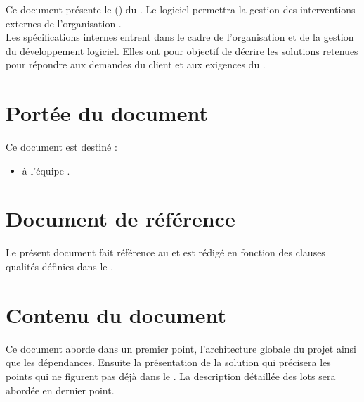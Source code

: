 Ce document présente le \DSI{} (\DSICourt) du \PIC{} \nomPIC. Le logiciel permettra la gestion des interventions externes de l'organisation \nomClient. \\

	Les spécifications internes entrent dans le cadre de l'organisation et de la gestion du développement logiciel. Elles ont pour objectif de décrire les solutions retenues pour répondre aux demandes du client et aux exigences du \DSECourt{}. 
	
\section*{Portée du document}
	Ce document est destiné :
	\begin{itemize}
		\item à l'équipe \PICCourt{} \nomEquipe.
	\end{itemize}
	
\section*{Document de référence}
	Le présent document fait référence au \DSE{} et est rédigé en fonction des clauses qualités définies dans le \PQ.
	
\section*{Contenu du document}
	Ce document aborde dans un premier point, l'architecture globale du projet ainsi que les dépendances. Ensuite la présentation de la solution qui précisera les points qui ne figurent pas déjà dans le \DSECourt{}. La description détaillée des lots sera abordée en dernier point.